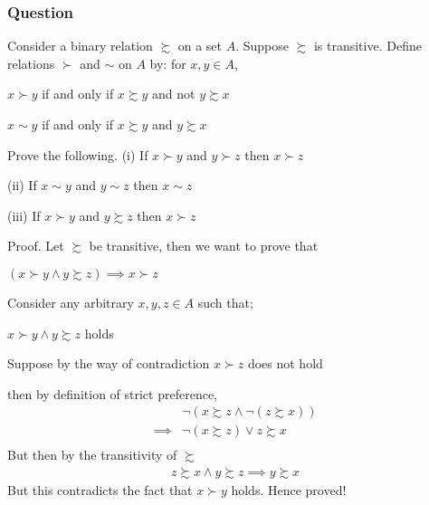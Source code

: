 \documentclass[12pt,a4paper]{article}
\begin{document}
   \subsubsection*{Question} 
  Consider a binary relation \(\succsim\) on a set \(A\). Suppose \(\succsim\) is transitive. Define relations \(\succ\) and \(\sim\) on \(A\) by: for \(x, y \in A\),

  \(x \succ y\) if and only if \(x \succsim y\) and not \(y \succsim x\)

  \(x \sim y\) if and only if \(x \succsim y\) and \(y \succsim x\)

  Prove the following.
(i) If \(x \succ y\) and \(y \succ z\) then \(x \succ z\)

(ii) If \(x \sim y\) and \(y \sim z\) then \(x \sim z\)

(iii) If \(x \succ y\) and \(y \succsim z\) then \(x \succ z\)

  \begin{tcolorbox}
    Proof. Let \(\succsim \)  be transitive, then we want to prove that 
    
    \(\left( x \succ y \wedge y \succsim z \right) \implies x \succ z \)
    
    Consider any arbitrary \(x,y,z \in A\) such that;
    
    \(x \succ y \wedge y \succsim z \) holds 
    
    Suppose by the way of contradiction \(x\succ z \) does not hold

    then by definition of strict preference, 
     \begin{align*}
        &\neg(x \succsim z \wedge \neg(z \succsim x))\\
        \implies &\neg(x \succsim z) \vee z \succsim x\\
     \end{align*}
     But then by the transitivity of \(\succsim \)  
      \begin{align*}
         z \succsim x \wedge y \succsim z \implies y \succsim x
     \end{align*}   
     But this contradicts the fact that \(x \succ y \) holds. Hence proved!
     \end{tcolorbox}
\end{document}
